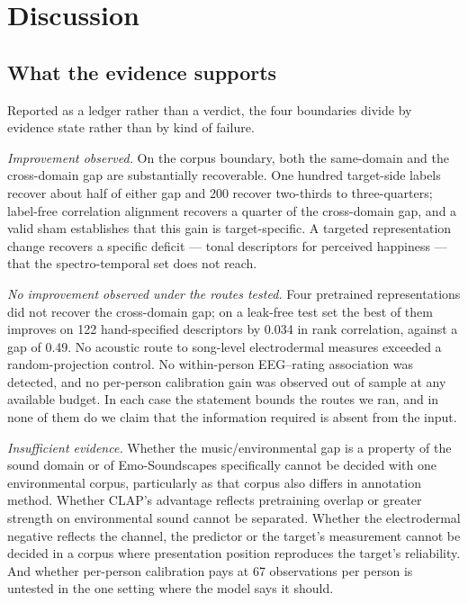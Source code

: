 \section{Discussion}

\subsection{What the evidence supports}

Reported as a ledger rather than a verdict, the four boundaries divide by
evidence state rather than by kind of failure.

\emph{Improvement observed.} On the corpus boundary, both the same-domain and
the cross-domain gap are substantially recoverable. One hundred target-side
labels recover about half of either gap and 200 recover two-thirds to
three-quarters; label-free correlation alignment recovers a quarter of the
cross-domain gap, and a valid sham establishes that this gain is
target-specific. A targeted representation change recovers a specific
deficit --- tonal descriptors for perceived happiness --- that the
spectro-temporal set does not reach.

\emph{No improvement observed under the routes tested.} Four pretrained
representations did not recover the cross-domain gap; on a leak-free test set
the best of them improves on 122 hand-specified descriptors by 0.034 in rank
correlation, against a gap of 0.49. No acoustic route to
song-level electrodermal measures exceeded a random-projection control. No
within-person EEG--rating association was detected, and no per-person
calibration gain was observed out of sample at any available budget. In each
case the statement bounds the routes we ran, and in none of them do we claim
that the information required is absent from the input.

\emph{Insufficient evidence.} Whether the music/environmental gap is a
property of the sound domain or of Emo-Soundscapes specifically cannot be
decided with one environmental corpus, particularly as that corpus also
differs in annotation method. Whether CLAP's advantage reflects pretraining
overlap or greater strength on environmental sound cannot be separated.
Whether the electrodermal negative reflects the channel, the predictor or the
target's measurement cannot be decided in a corpus where presentation position
reproduces the target's reliability. And whether per-person calibration pays
at 67 observations per person is untested in the one setting where the model
says it should.

